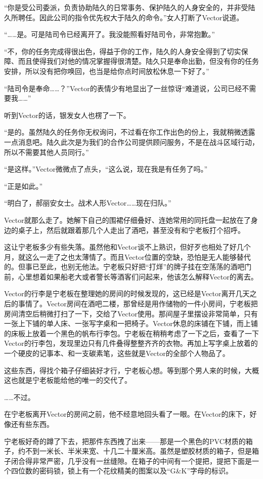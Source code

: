 “你是受公司委派，负责协助陆久的日常事务、保护陆久的人身安全的，并非受陆久所聘任。因此公司的指令优先权大于陆久的命令。”女人打断了Vector说道。

“……是。可是陆司令已经离开了。我没能照看好陆司令，非常抱歉。”

“不，你的任务完成得很出色，得益于你的工作，陆久的人身安全得到了切实保障、而且使得我们对他的情况掌握得很清楚。陆久只是奉命出勤，但没有你的任务安排，所以没有把你唤回，也当是给你点时间放松休息一下好了。”

“陆司令是奉命……？”Vector的表情少有地显出了一丝惊讶“难道说，公司已经不需要我……”

听到Vector的话，银发女人也楞了一下。

“是的。虽然陆久的任务你无权询问，不过看在你工作出色的份上，我就稍微透露一点消息吧。陆久此次是为我们的合作公司提供顾问服务，不是在战斗区域行动，所以不需要其他人员同行。”

“是这样。”Vector微微点了点头，“这么说，现在我是有任务了吗。”

“正是如此。”

“明白了，郝丽安女士。战术人形Vector……现在归队。”

Vector就那么走了。她解下自己的围裙仔细叠好、连她常用的同托盘一起放在了身边的桌子上，然后就跟着那几个人走出了酒吧，甚至没有和宁老板打个招呼。

这让宁老板多少有些失落。虽然他和Vector谈不上熟识，但好歹也相处了好几个月，就这么一走了之也太薄情了。而且Vector位置的空缺，恐怕是无人能够替代的。但事已至此，也别无他法。宁老板只好把“打烊”的牌子挂在空荡荡的酒吧门前，心里想着如果船老大或者警长等酒客们问起来，他该怎么解释Vector的离去。

Vector的行李是宁老板在整理她的房间的时候发现的，这已经是Vector离开几天之后的事情了。Vector房间在酒吧二楼，那曾经是用作储物的一件小房间，宁老板把房间清空后稍微打扫了一下，交给了Vector使用。那间屋子里摆设非常简单，只有一张上下铺的单人床、一张写字桌和一把椅子。Vector休息的床铺在下铺，而上铺的床板上放着一个黑色的帆布行李包。宁老板在稍稍考虑了一下之后，查看了一下Vector的行李包，发现里边只有几件叠得整整齐齐的衣物。再加上写字桌上放着的一个硬皮的记事本、和一支碳素笔，这些就是Vector的全部个人物品了。

这些东西，得找个箱子仔细装好才行，宁老板心想。等到那个男人来的时候，大概这也就是宁老板能给他的唯一的交代了。

……不过。

在宁老板离开Vector的房间之前，他不经意地回头看了一眼。在Vector的床下，好像还有些东西。

宁老板好奇的蹲了下去，把那件东西拽了出来——那是一个黑色的PVC材质的箱子，约不到一米长、半米来宽、十几二十厘米高。虽然是塑胶材质的箱子，但是箱子闭合得非常严密，几乎没有一丝缝隙。在箱子的中间有一个提把，提把下面是一个四位数的密码锁，锁上有一个花纹精美的图案以及“G\&K”字母的标识。

